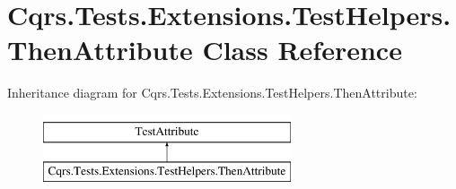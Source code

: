 \hypertarget{classCqrs_1_1Tests_1_1Extensions_1_1TestHelpers_1_1ThenAttribute}{}\section{Cqrs.\+Tests.\+Extensions.\+Test\+Helpers.\+Then\+Attribute Class Reference}
\label{classCqrs_1_1Tests_1_1Extensions_1_1TestHelpers_1_1ThenAttribute}
Inheritance diagram for Cqrs.\+Tests.\+Extensions.\+Test\+Helpers.\+Then\+Attribute\+:\begin{figure}[H]
\begin{center}
\leavevmode
\includegraphics[height=2.000000cm]{classCqrs_1_1Tests_1_1Extensions_1_1TestHelpers_1_1ThenAttribute}
\end{center}
\end{figure}

